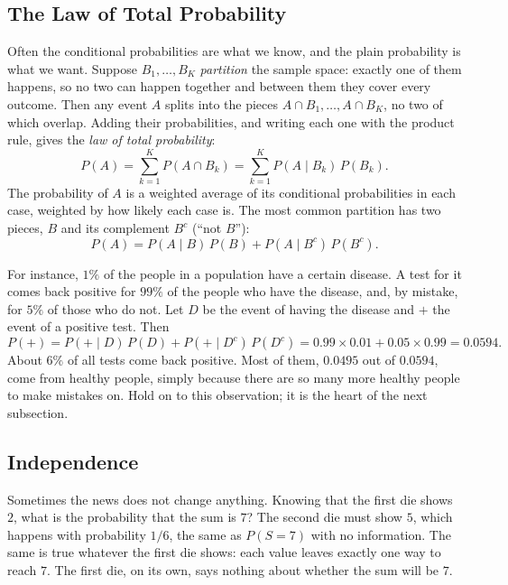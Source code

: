 \subsection{The Law of Total Probability}
\label{sec:ch05-total-prob}

Often the conditional probabilities are what we know, and the plain
probability is what we want. Suppose $B_1, \dots, B_K$ \emph{partition}
the sample space: exactly one of them happens, so no two can happen
together and between them they cover every outcome. Then any event $A$
splits into the pieces $A \cap B_1, \dots, A \cap B_K$, no two of which
overlap. Adding their probabilities, and writing each one with the
product rule, gives the \emph{law of total probability}:
\begin{equation}
  P(A) = \sum_{k=1}^{K} P(A \cap B_k)
  = \sum_{k=1}^{K} P(A \mid B_k)\, P(B_k) .
  \label{eq:ch05-total-prob}
\end{equation}
The probability of $A$ is a weighted average of its conditional
probabilities in each case, weighted by how likely each case is. The
most common partition has two pieces, $B$ and its complement $B^c$
(``not $B$''):
\[
  P(A) = P(A \mid B)\, P(B) + P(A \mid B^c)\, P(B^c) .
\]

For instance, $1\%$ of the people in a population have a certain
disease. A test for it comes back positive for $99\%$ of the people who
have the disease, and, by mistake, for $5\%$ of those who do not. Let $D$
be the event of having the disease and $+$ the event of a positive test.
Then
\[
  P(+) = P(+ \mid D)\, P(D) + P(+ \mid D^c)\, P(D^c)
  = 0.99 \times 0.01 + 0.05 \times 0.99 = 0.0594 .
\]
About $6\%$ of all tests come back positive. Most of them, $0.0495$ out
of $0.0594$, come from healthy people, simply because there are so many
more healthy people to make mistakes on. Hold on to this observation; it
is the heart of the next subsection.

\subsection{Independence}
\label{sec:ch05-independence}

Sometimes the news does not change anything. Knowing that the first die
shows $2$, what is the probability that the sum is $7$? The second die
must show $5$, which happens with probability $1/6$, the same as $P(S =
7)$ with no information. The same is true whatever the first die shows:
each value leaves exactly one way to reach $7$. The first die, on its
own, says nothing about whether the sum will be $7$.

